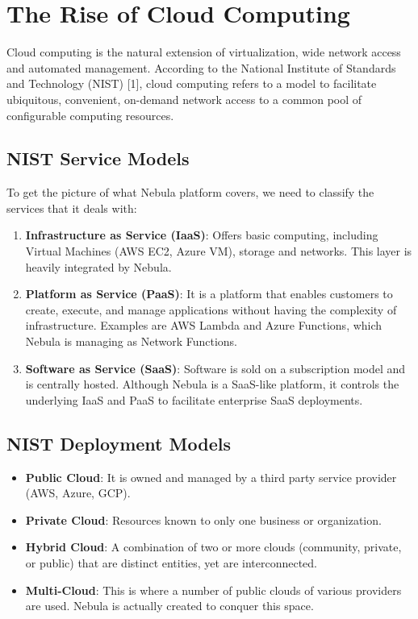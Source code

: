 \section{The Rise of Cloud Computing}
Cloud computing is the natural extension of virtualization, wide network access and automated management. According to the National Institute of Standards and Technology (NIST) [1], cloud computing refers to a model to facilitate ubiquitous, convenient, on-demand network access to a common pool of configurable computing resources.

\subsection{NIST Service Models}
To get the picture of what Nebula platform covers, we need to classify the services that it deals with:
\begin{enumerate}
    \item \textbf{Infrastructure as Service (IaaS)}: Offers basic computing, including Virtual Machines (AWS EC2, Azure VM), storage and networks. This layer is heavily integrated by Nebula.

    \item \textbf{Platform as Service (PaaS)}: It is a platform that enables customers to create, execute, and manage applications without having the complexity of infrastructure. Examples are AWS Lambda and Azure Functions, which Nebula is managing as Network Functions.
    \item \textbf{Software as Service (SaaS)}: Software is sold on a subscription model and is centrally hosted. Although Nebula is a SaaS-like platform, it controls the underlying IaaS and PaaS to facilitate enterprise SaaS deployments.
\end{enumerate}

\subsection{NIST Deployment Models}
\begin{itemize}
    \item \textbf{Public Cloud}: It is owned and managed by a third party service provider (AWS, Azure, GCP).
    \item \textbf{Private Cloud}: Resources known to only one business or organization.
    \item \textbf{Hybrid Cloud}: A combination of two or more clouds (community, private, or public) that are distinct entities, yet are interconnected.
    \item \textbf{Multi-Cloud}: This is where a number of public clouds of various providers are used. Nebula is actually created to conquer this space.
\end{itemize}

